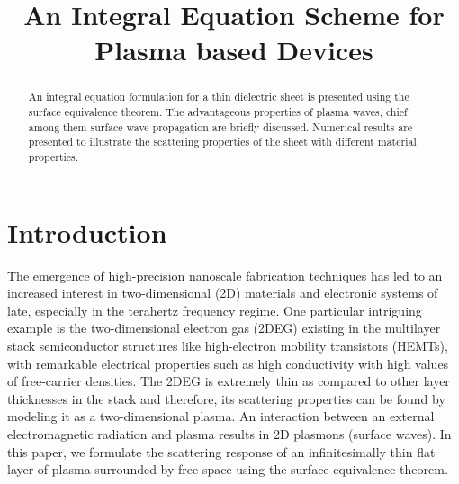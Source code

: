 \documentclass[conference, 10pt]{IEEEtran}
\renewcommand{\^}{\hat}  %
\begin{document}
\title{An Integral Equation Scheme for Plasma based Devices}


\author{
\and
{}
}
\maketitle


%
\begin{abstract}
  An integral equation formulation for a thin dielectric sheet is presented using the surface equivalence theorem. The advantageous properties of plasma waves, chief among them surface wave propagation are briefly discussed. Numerical results are presented to illustrate the scattering properties of the sheet with different material properties.
\end{abstract}

\IEEEpeerreviewmaketitle
\section{Introduction}

The emergence of high-precision nanoscale fabrication techniques has led to an increased interest in two-dimensional (2D) materials and electronic systems of late, especially in the terahertz frequency regime. One particular intriguing example is the two-dimensional electron gas (2DEG) existing in the multilayer stack semiconductor structures like high-electron mobility transistors (HEMTs), with remarkable electrical properties such as high conductivity with high values of free-carrier densities. The 2DEG is extremely thin as compared to other layer thicknesses in the stack and therefore, its scattering properties can be found by modeling it as a two-dimensional plasma. An interaction between an external electromagnetic radiation and plasma results in 2D plasmons (surface waves). In this paper, we formulate the scattering response of an infinitesimally thin flat layer of plasma surrounded by free-space using the surface equivalence theorem.
\end{document}
